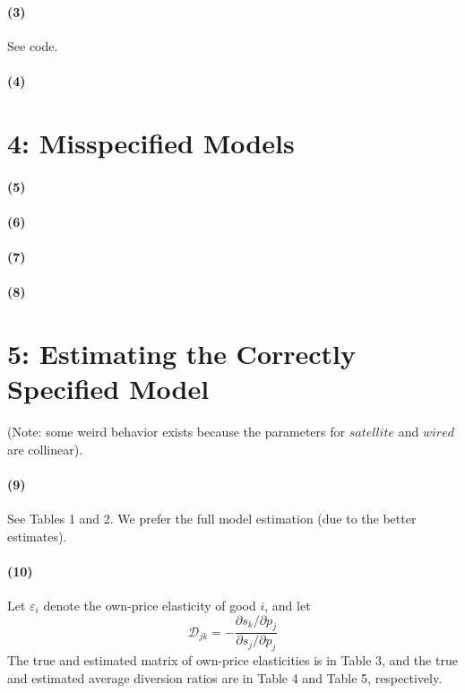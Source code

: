 \documentclass[10pt,letter]{article}
\begin{document}
\paragraph{(3)} See code.
\paragraph{(4)}
\section*{4: Misspecified Models}
\paragraph{(5)}
\paragraph{(6)}
\paragraph{(7)}
\paragraph{(8)} 

\section*{5: Estimating the Correctly Specified Model}
(Note: some weird behavior exists because the parameters for $satellite$ and $wired$ are collinear).

\paragraph{(9)} See Tables 1 and 2. We prefer the full model estimation (due to the better estimates).

\paragraph{(10)} Let $\varepsilon_i$ denote the own-price elasticity of good $i$, and let\[ \mathcal{D}_{jk}  = - \frac{\partial s_{k} / \partial p_j}{\partial s_j / \partial p_j} \] The true and estimated matrix of own-price elasticities is in Table 3, and the true and estimated average diversion ratios are in Table 4 and Table 5, respectively.




\end{document}
